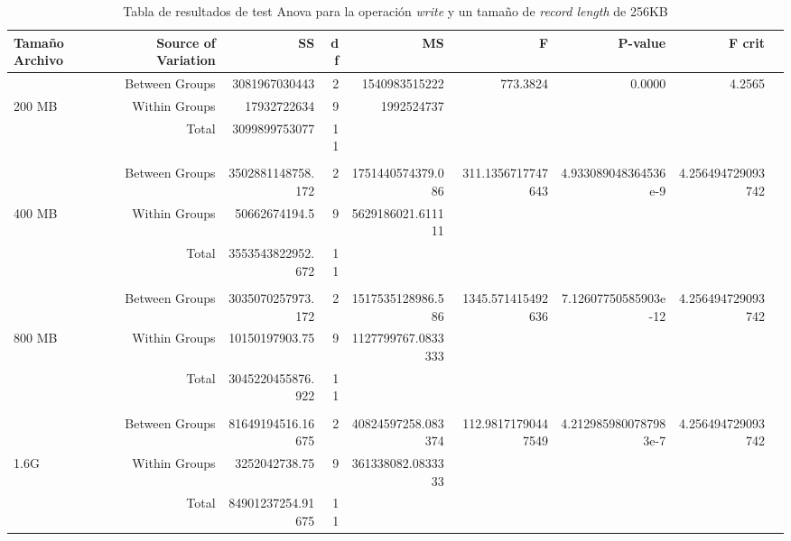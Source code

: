 \begin{landscape}
\begin{table}[!htp]\centering
\caption{Tabla de resultados de test Anova para la operación \textit{write} y un tamaño de \textit{record length} de 256KB}\label{tab: }
\scriptsize
\begin{tabular}{lrrrrrrrr}\toprule
Tamaño Archivo &Source of Variation &SS &df &MS &F &P-value &F crit \\\midrule
&Between Groups &3081967030443 &2 &1540983515222 &773.3824 &0.0000 &4.2565 \\
200 MB &Within Groups &17932722634 &9 &1992524737 & & & \\
&Total &3099899753077 &11 & & & & \\
& & & & & & & \\
&Between Groups &3502881148758.172 &2 &1751440574379.086 &311.1356717747643 &4.933089048364536e-9 &4.256494729093742 \\
400 MB &Within Groups &50662674194.5 &9 &5629186021.611111 & & & \\
&Total &3553543822952.672 &11 & & & & \\
& & & & & & & \\
&Between Groups &3035070257973.172 &2 &1517535128986.586 &1345.571415492636 &7.12607750585903e-12 &4.256494729093742 \\
800 MB &Within Groups &10150197903.75 &9 &1127799767.0833333 & & & \\
&Total &3045220455876.922 &11 & & & & \\
& & & & & & & \\
&Between Groups &81649194516.16675 &2 &40824597258.083374 &112.98171790447549 &4.2129859800787983e-7 &4.256494729093742 \\
1.6G &Within Groups &3252042738.75 &9 &361338082.0833333 & & & \\
&Total &84901237254.91675 &11 & & & & \\

\end{tabular}
\end{table}
\end{landscape}
